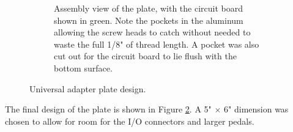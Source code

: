 \begin{figure}
\begin{subfigure}{0.55\textwidth}
				\caption{Assembly view of the plate, with the circuit board shown in green.  Note the pockets in the aluminum allowing the screw heads to catch without needed to waste the full 1/8" of thread length.  A pocket was also cut out for the circuit board to lie flush with the bottom surface.}
				\label{fig:NF_AP_sum}
			\end{subfigure}
			\caption{Universal adapter plate design.}
			\label{fig:finalplatedesign}
		\end{figure}

		The final design of the plate is shown in Figure \ref{fig:finalplatedesign}.  A 5" $\times$ 6" dimension was chosen to allow for room for the I/O connectors and larger pedals.
